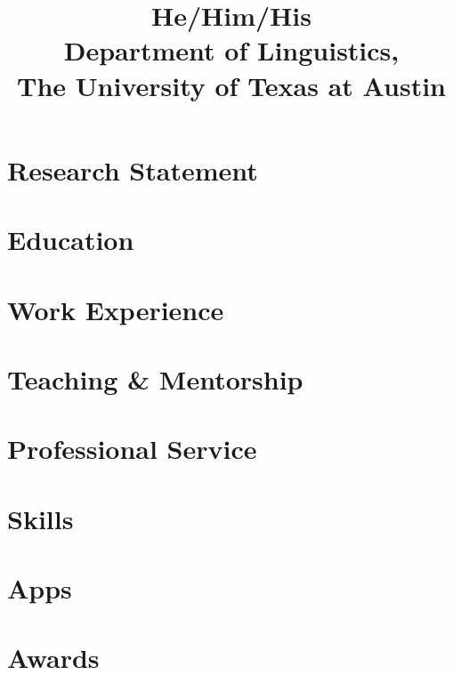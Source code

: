 \documentclass[11pt, letterpaper]{practical-cv}
\title{He/Him/His\\Department of Linguistics,\\The University of Texas at Austin}
\begin{document}
\makecvtitle

\section{Research Statement}


\section{Education}


\printbibliography[title=Publications, nottype=talk]

\printbibliography[title=Talks, type=talk]

\section{Work Experience}


\section{Teaching \& Mentorship}


\section{Professional Service}


\section{Skills}


\section{Apps}


\section{Awards}

\end{document}
